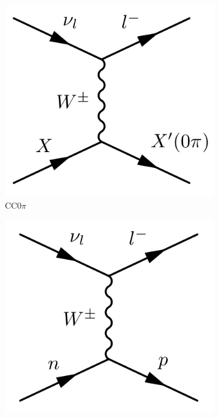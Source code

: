\begin{figure}[h]
	\centering
	\begin{subfigure}[t]{0.32\textwidth}
		\includegraphics[width=\textwidth, trim={0mm 0mm 0mm 0mm}, clip,page=1]{figures/niwg/diagrams/CC0pi}
		\caption{CC0$\pi$}
	\end{subfigure}
	\begin{subfigure}[t]{0.32\textwidth}
		\includegraphics[width=\textwidth, trim={0mm 0mm 0mm 0mm}, clip,page=1]{figures/niwg/diagrams/CCQE}

\end{subfigure}
\end{figure}
